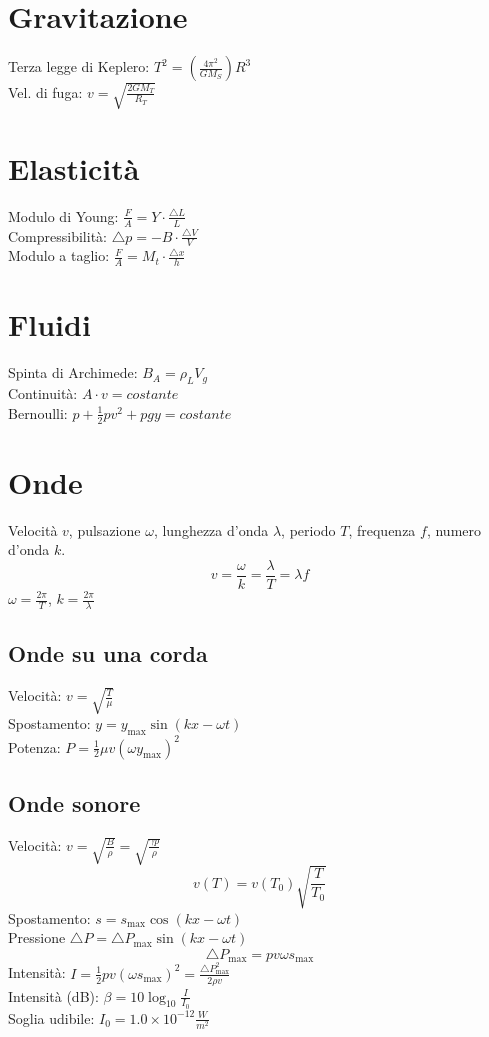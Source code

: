 \documentclass{article}
\begin{document}
\begin{small}
\begin{multicols}{3}
\section{Gravitazione}
		Terza legge di Keplero: $ T^2 = ( \frac{ 4 \pi^2 }{ GM_S } ) R^3 $ \\
		Vel. di fuga: $ v = \sqrt{ \frac{ 2 GM_T }{ R_T } } $
\section{Elasticità}
		Modulo di Young: $ \frac{ F }{ A } = Y \cdot \frac{ \triangle L }{ L } $ \\
		Compressibilità: $ \triangle p = - B \cdot \frac{ \triangle V }{ V } $ \\
		Modulo a taglio: $ \frac{ F }{ A } = M_t \cdot \frac{ \triangle x }{ h } $
\section{Fluidi}
		Spinta di Archimede: $ B_A = \rho_L V_g $ \\
		Continuità: $ A \cdot v = costante $ \\
		Bernoulli: $ p + \frac{1}{2} p v^2 + p g y = costante $
\section{Onde}
		Velocità $v$, pulsazione $\omega$, lunghezza d'onda $\lambda$, periodo $T$, frequenza $f$, numero d'onda $k$.
		\[ v = \frac{ \omega }{ k } = \frac{ \lambda }{ T } = \lambda f \]
		$ \omega = \frac{ 2 \pi }{ T } $, $ k = \frac{ 2 \pi }{ \lambda } $
	\subsection{Onde su una corda}
		Velocità: $ v = \sqrt{ \frac{ T }{ \mu } } $ \\
		Spostamento: $ y = y_{\max} \sin ( k x - \omega t ) $ \\
		Potenza: $ P = \frac{1}{2} \mu v ( \omega y_{\max} )^2 $
	\subsection{Onde sonore}
		Velocità: $ v = \sqrt{ \frac{ B }{ \rho } } = \sqrt{ \frac{ \gamma p }{ \rho } } $
		\[ v ( T ) = v ( T_0 ) \sqrt{ \frac{ T }{ T_0 } } \]
		Spostamento: $ s = s_{\max} \cos ( k x - \omega t ) $ \\
		Pressione $ \triangle P = \triangle P_{\max} \sin ( k x - \omega t ) $
		\[ \triangle P_{\max} = p v \omega s_{\max} \]
		Intensità: $ I = \frac{1}{2} p v ( \omega s_{\max} )^2 = \frac{ \triangle P_{\max}^2 }{ 2 \rho v } $ \\
		Intensità (dB): $ \beta = 10 \log_{10} \frac{ I }{ I_0 } $ \\
		Soglia udibile: $ I_0 = 1.0 \times 10^{-12} \frac{ W }{ m^2 } $

\end{multicols}
\end{small}
\end{document}
